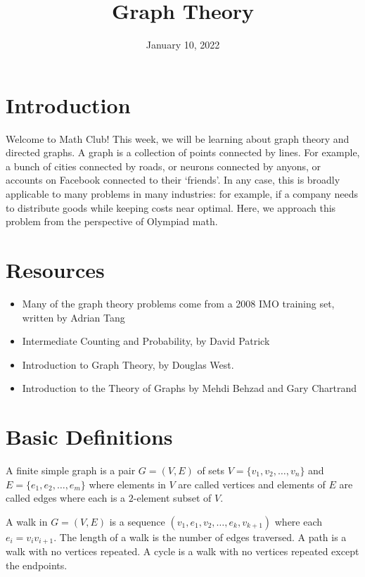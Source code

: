 \documentclass{article}
\title{Graph Theory}
\author{}
\date{January 10, 2022}
\begin{document}
\section{Introduction}
Welcome to Math Club! This week, we will be learning about graph theory and directed graphs. A graph is a collection of points connected by lines. For example, a bunch of cities connected by roads, or neurons connected by anyons, or accounts on Facebook connected to their ‘friends’. In any case, this is broadly applicable to many problems in many industries: for example, if a company needs to distribute goods while keeping costs near optimal. Here, we approach this problem from the perspective of Olympiad math.


\section{Resources}
\begin{itemize}
    \item Many of the graph theory problems come from a 2008 IMO training set, written by Adrian Tang
    
    \item Intermediate Counting and Probability, by David Patrick
    
    \item Introduction to Graph Theory, by Douglas West.
    
    \item Introduction to the Theory of Graphs by Mehdi Behzad and Gary Chartrand
\end{itemize}


\section{Basic Definitions} 
\begin{definition}
A finite simple graph is a pair $G = (V, E)$ of sets $V = \{v_{1}, v_{2}, \ldots, v_{n}\}$ and $E = \{e_{1}, e_{2}, \ldots, e_{m}\}$ where elements in $V$ are called vertices and elements of $E$ are called edges where each is a $2$-element subset of $V$. 
\end{definition}

\begin{definition}
A walk in $G = (V, E)$ is a sequence $(v_{1}, e_{1}, v_{2}, \ldots, e_{k}, v_{k + 1})$ where each $e_{i} = v_{i}v_{i + 1}$. The length of a walk is the number of edges traversed. A path is a walk with no vertices repeated. A cycle is a walk with no vertices repeated except the endpoints.
\end{definition}
\end{document}
